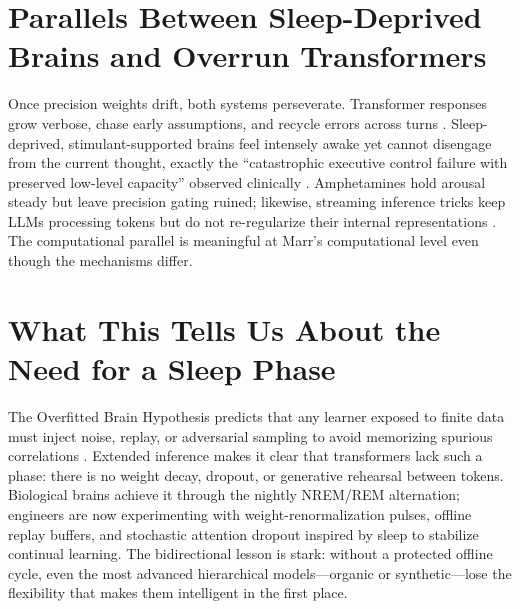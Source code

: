 \section{Parallels Between Sleep-Deprived Brains and Overrun Transformers}\label{sec:parallels_brains_llms}
Once precision weights drift, both systems perseverate. Transformer responses grow verbose, chase early assumptions, and recycle
errors across turns \citep{patel2025multiturn}. Sleep-deprived, stimulant-supported brains feel intensely awake yet cannot disengage from
the current thought, exactly the ``catastrophic executive control failure with preserved low-level capacity'' observed clinically
\citep{franklin2023precision}. Amphetamines hold arousal steady but leave precision gating ruined; likewise, streaming inference tricks keep
LLMs processing tokens but do not re-regularize their internal representations \citep{chen2023attention_sink, li2024lengthcollapse}. The
computational parallel is meaningful at Marr's computational level even though the mechanisms differ.

\section{What This Tells Us About the Need for a Sleep Phase}\label{sec:need_sleep_phase}
The Overfitted Brain Hypothesis predicts that any learner exposed to finite data must inject noise, replay, or adversarial sampling
to avoid memorizing spurious correlations \citep{hoel2021overfitted}. Extended inference makes it clear that transformers lack such a phase: there is
no weight decay, dropout, or generative rehearsal between tokens. Biological brains achieve it through the nightly NREM/REM alternation;
engineers are now experimenting with weight-renormalization pulses, offline replay buffers, and stochastic attention dropout inspired by
sleep to stabilize continual learning. The bidirectional lesson is stark: without a protected offline cycle, even the most advanced
hierarchical models---organic or synthetic---lose the flexibility that makes them intelligent in the first place.
